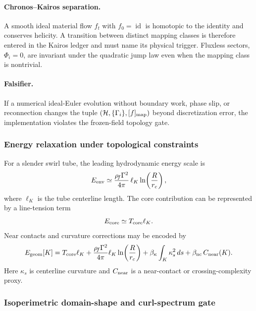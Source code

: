 \paragraph{Chronos--Kairos separation.}
A smooth ideal material flow $f_t$ with $f_0=\operatorname{id}$ is homotopic to
the identity and conserves helicity.  A transition between distinct mapping
classes is therefore entered in the Kairos ledger and must name its physical
trigger.  Fluxless sectors, $\Phi_i=0$, are invariant under the quadratic jump
law even when the mapping class is nontrivial.

\paragraph{Falsifier.}
If a numerical ideal-Euler evolution without boundary work, phase slip, or
reconnection changes the tuple
$\left(\mathcal H,\{\Gamma_i\},[f]_{\rm map}\right)$ beyond discretization
error, the implementation violates the frozen-field topology gate.

\subsubsection{Energy relaxation under topological constraints}
For a slender swirl tube, the leading hydrodynamic energy scale is
\begin{equation}
    E_{\rm env}
    \simeq
    \frac{\rho_{\!f}\Gamma^2}{4\pi}\,\ell_K\ln\!\left(\frac{R}{r_c}\right),
    \label{eq:env_energy_tfm}
\end{equation}
where $\ell_K$ is the tube centerline length. The core contribution can be represented by a line-tension term
\begin{equation}
    E_{\rm core}\simeq T_{\rm core}\ell_K.
    \label{eq:core_line_tension}
\end{equation}
Near contacts and curvature corrections may be encoded by
\begin{equation}
    E_{\rm geom}[K]
    =T_{\rm core}\ell_K
    +\frac{\rho_{\!f}\Gamma^2}{4\pi}\ell_K\ln\!\left(\frac{R}{r_c}\right)
    +\beta_{\kappa}\int_K \kappa_s^2\,ds
    +\beta_{\rm nc}\,C_{\rm near}(K).
    \label{eq:geometric_energy_functional}
\end{equation}
Here $\kappa_s$ is centerline curvature and $C_{\rm near}$ is a near-contact or crossing-complexity proxy.

\subsubsection{Isoperimetric domain-shape and curl-spectrum gate}
\label{subsubsec:rt_isoperimetric_domain_shape}
